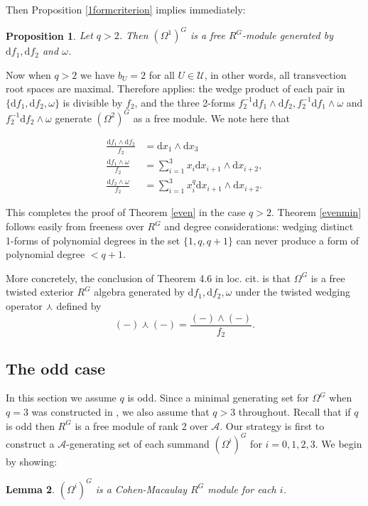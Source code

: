 \documentclass[a4paper]{amsart}
\newcommand{\dd}{\mathrm{d}}
\newtheorem{Lemma}{Lemma}[section]
\newtheorem{prop}[Lemma]{Proposition}
\newtheorem*{Corollary of Conjecture}{Corollary of Conjecture}
\theoremstyle{definition}
\theoremstyle{remark}
\theoremstyle{Acknowledgments}
\begin{document}
Then Proposition \ref{1formcriterion} implies immediately:
\begin{prop}
Let $q>2$. Then $(\Omega^1)^G$ is a free $R^G$-module generated by $\dd f_1, \dd f_2$ and $\omega$.
\end{prop}
 
Now when $q>2$ we have $b_U=2$ for all $U \in \mathcal{U}$, in other words, all transvection root spaces are maximal. Therefore \cite[Theorem~4.6]{HansonShepler} applies: the wedge product of each pair in $\{\dd f_1, \dd f_2, \omega\}$ is divisible by $f_2$, and the three 2-forms $f_2^{-1} \dd f_1 \wedge \dd f_2,f_2^{-1} \dd f_1 \wedge \omega$ and $f_2^{-1} \dd f_2 \wedge \omega$ generate $(\Omega^2)^G$ as a free module. We note here that

\begin{align*} \frac{\dd f_1 \wedge \dd f_2}{f_2} &= \dd x_1 \wedge \dd x_3\\ \frac{{\dd f_1 \wedge \omega}}{f_2} &= \sum_{i=1}^3 x_i \dd x_{i+1} \wedge \dd x_{i+2}, \\  \frac{{\dd f_2 \wedge \omega}}{f_2} &= \sum_{i=1}^3 x^q_i \dd x_{i+1} \wedge \dd x_{i+2}. \end{align*}

This completes the proof of Theorem \ref{even} in the case $q>2$. Theorem \ref{evenmin} follows easily from freeness over $R^G$ and degree considerations: wedging distinct 1-forms of polynomial degrees in the set $\{1, q, q+1\}$ can never produce a form of polynomial degree $<q+1$. 

More concretely, the conclusion of Theorem 4.6 in loc. cit. is that $\Omega^G$ is a free twisted exterior $R^G$ algebra generated by $\dd f_1, \dd f_2, \omega$ under the twisted wedging operator $\curlywedge$ defined by
\[(-)\curlywedge (-) = \frac{(-) \wedge (-)}{f_2}.\]

\subsection{The odd case}\label{sec:odd}

In this section we assume $q$ is odd. Since a minimal generating set for $\Omega^G$ when $q=3$ was constructed in \cite{ElmerMeyer}, we also assume that $q>3$ throughout. Recall that if $q$ is odd then $R^G$ is a free module of rank 2 over $\mathcal{A}$. Our strategy is first to construct a $\mathcal{A}$-generating set of each summand $(\Omega^i)^G$ for $i=0,1,2,3$. We begin by showing:

\begin{Lemma}
$(\Omega^i)^G$ is a Cohen-Macaulay $R^G$ module for each $i$.
\end{Lemma}
\end{document}
